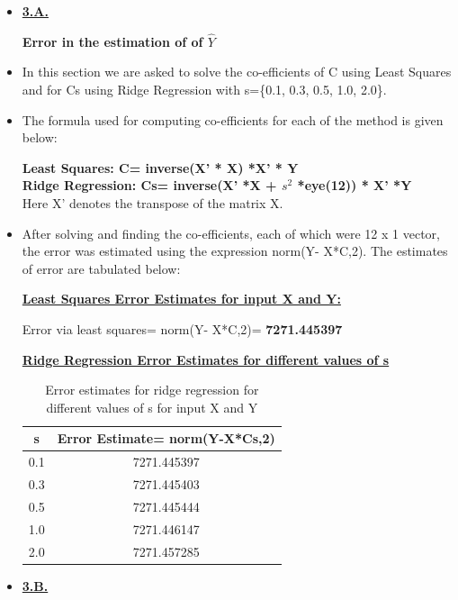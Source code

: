\documentclass[11pt]{article}
\begin{document}
\begin{itemize}
	\item[] \underline{\textbf{3.A.}}
	
	\textbf{Error in the estimation of of $\hat Y$}
	
	\item[] In this section we are asked to solve the co-efficients of C using Least Squares and for Cs using Ridge Regression with s=\{0.1, 0.3, 0.5, 1.0, 2.0\}.
	
	\item[] The formula used for computing co-efficients for each of the method is given below:
	
	\textbf{Least Squares: C= inverse(X' * X) *X' * Y} \\
	\textbf{Ridge Regression: Cs= inverse(X' *X + $s^2 $ *eye(12)) * X' *Y} \\
	
	Here X' denotes the transpose of the matrix X.
	
	\item[] After solving and finding the co-efficients, each of which were 12 x 1 vector, the error was estimated using the expression norm(Y- X*C,2). The estimates of error are tabulated below:
	
		\textbf{\underline{Least Squares Error Estimates for input X and Y:}}
		
		Error via least squares= norm(Y- X*C,2)= \textbf{7271.445397}
	
	\pagebreak
	\textbf{\underline{Ridge Regression Error Estimates for different values of s}}
	
	
	\begin{table}[h]
		\centering
		\begin{tabular}{|c|c|}
			\hline
			\textbf{s}  & \textbf{Error Estimate= norm(Y-X*Cs,2)}\\
			\hline
			0.1 &  7271.445397  \\
			\hline
			0.3&  7271.445403 \\
			\hline
			0.5 &  7271.445444  \\
			\hline
			1.0 &  7271.446147  \\
			\hline
			2.0 & 7271.457285 \\
			\hline
			\end{tabular}
		\caption{Error estimates for ridge regression for different values of s for input X and Y }
		\label{t2}
	\end{table}
	
	
	
	
		\item[] \underline{\textbf{3.B.}}
			

\end{itemize}
\end{document}
